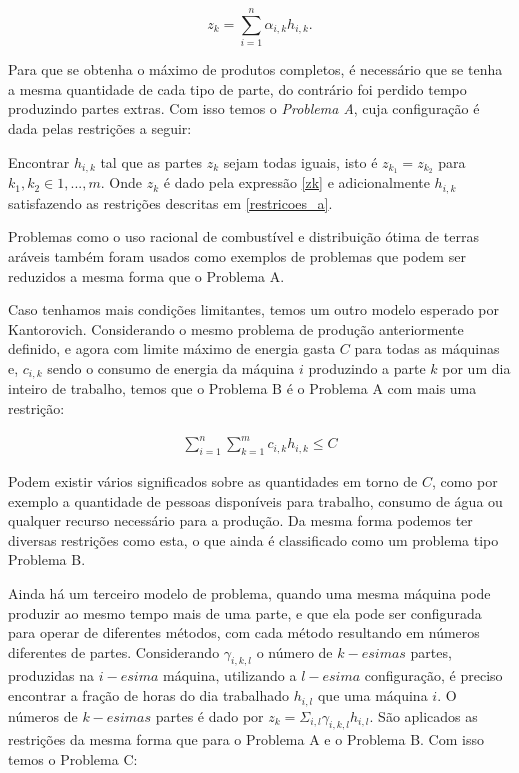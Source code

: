 \begin{equation}
  z_k = \sum_{i=1}^n \alpha_{i, k} h_{i, k}.
  \label{zk}
\end{equation}


\par Para que se obtenha o máximo de produtos completos, é necessário que se tenha a mesma quantidade de
cada tipo de parte, do contrário foi perdido tempo produzindo partes extras. Com isso temos o
\textit{Problema A}, cuja configuração é dada pelas restrições a seguir:

\begin{center}
  Encontrar \(h_{i, k}\) tal que as partes \(z_k\) sejam todas iguais, isto é \(z_{k_1} = z_{k_2} \)
  para \(k_1, k_2 \in {1, ..., m}\). Onde \(z_k\) é dado pela expressão \ref{zk} e adicionalmente
  \(h_{i, k}\) satisfazendo as restrições descritas em \ref{restricoes_a}.
\end{center}

Problemas como o uso racional de combustível e distribuição ótima de terras aráveis
também foram usados como exemplos de problemas que podem ser reduzidos a mesma forma
que o Problema A.

Caso tenhamos mais condições limitantes, temos um outro modelo esperado por Kantorovich.
Considerando o mesmo problema de produção anteriormente definido, e agora com limite
máximo de energia gasta \(C\) para todas as máquinas e, \(c_{i, k}\) sendo o consumo de energia
da máquina \(i\) produzindo a parte \(k\) por um dia inteiro de trabalho, temos que o
Problema B é o Problema A com mais uma restrição:

\begin{align}
  \sum_{i=1}^n \sum_{k=1}^m c_{i, k} h_{i, k} \leq C
\end{align}

Podem existir vários significados sobre as quantidades em torno de \(C\), como por exemplo
a quantidade de pessoas disponíveis para trabalho, consumo de água ou qualquer recurso
necessário para a produção. Da mesma forma podemos ter diversas restrições como esta,
o que ainda é classificado como um problema tipo Problema B.

Ainda há um terceiro modelo de problema, quando uma mesma máquina pode produzir ao mesmo tempo
mais de uma parte, e que ela pode ser configurada para operar de diferentes métodos, com cada
método resultando em números diferentes de partes. Considerando \( \gamma_{i, k, l} \) o número de
\(k-esimas\) partes, produzidas na \(i-esima\) máquina, utilizando a \(l-esima\) configuração,
é preciso encontrar a fração de horas do dia trabalhado \(h_{i, l}\) que uma máquina \(i\).
O números de \(k-esimas\) partes é dado por \( z_k = \Sigma_{i, l} \gamma_{i, k, l} h_{i, l}\). São aplicados as
restrições da mesma forma que para o Problema A e o Problema B. Com isso temos o Problema C:

